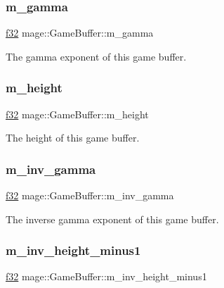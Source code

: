 \subsubsection{\texorpdfstring{m\+\_\+gamma}{m\_gamma}}
{\footnotesize\ttfamily \hyperlink{namespacemage_a6a44ad388483959dc4dff9f2aef91431}{f32} mage\+::\+Game\+Buffer\+::m\+\_\+gamma}

The gamma exponent of this game buffer. \hypertarget{structmage_1_1_game_buffer_a3bbb3cedcf9c75ca69d2424275264129}{}\label{structmage_1_1_game_buffer_a3bbb3cedcf9c75ca69d2424275264129} 
\subsubsection{\texorpdfstring{m\+\_\+height}{m\_height}}
{\footnotesize\ttfamily \hyperlink{namespacemage_a6a44ad388483959dc4dff9f2aef91431}{f32} mage\+::\+Game\+Buffer\+::m\+\_\+height}

The height of this game buffer. \hypertarget{structmage_1_1_game_buffer_ade898ebb4f6ee2766e67162494df249c}{}\label{structmage_1_1_game_buffer_ade898ebb4f6ee2766e67162494df249c} 
\subsubsection{\texorpdfstring{m\+\_\+inv\+\_\+gamma}{m\_inv\_gamma}}
{\footnotesize\ttfamily \hyperlink{namespacemage_a6a44ad388483959dc4dff9f2aef91431}{f32} mage\+::\+Game\+Buffer\+::m\+\_\+inv\+\_\+gamma}

The inverse gamma exponent of this game buffer. \hypertarget{structmage_1_1_game_buffer_a1b3ac2e9c244354b90f31926de4e5774}{}\label{structmage_1_1_game_buffer_a1b3ac2e9c244354b90f31926de4e5774} 
\subsubsection{\texorpdfstring{m\+\_\+inv\+\_\+height\+\_\+minus1}{m\_inv\_height\_minus1}}
{\footnotesize\ttfamily \hyperlink{namespacemage_a6a44ad388483959dc4dff9f2aef91431}{f32} mage\+::\+Game\+Buffer\+::m\+\_\+inv\+\_\+height\+\_\+minus1}

